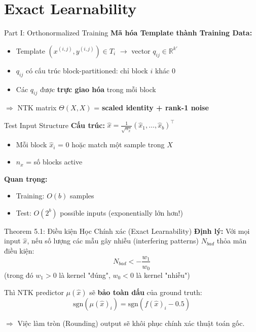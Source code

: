 \section{Exact Learnability}

\begin{frame}{Part I: Orthonormalized Training}
  \textbf{Mã hóa Template thành Training Data:}
  \begin{itemize}
    \item Template $(x^{(i,j)}, y^{(i,j)}) \in T_i$ $\to$ vector $q_{ij} \in \mathbb{R}^{k'}$
    \item $q_{ij}$ có cấu trúc block-partitioned: chỉ block $i$ khác 0
    \item Các $q_{ij}$ được \textbf{trực giao hóa} trong mỗi block
  \end{itemize}

  \vspace{0.3cm}
  $\Rightarrow$ NTK matrix $\Theta(X,X)$ = \textbf{scaled identity + rank-1 noise}
\end{frame}

\begin{frame}{Test Input Structure}
  \textbf{Cấu trúc:} $\hat{x} = \frac{1}{\sqrt{n_{\hat{x}}}} (\hat{x}_1, \ldots, \hat{x}_b)^\top$
  
  \begin{itemize}
    \item Mỗi block $\hat{x}_i$ = 0 hoặc match một sample trong $X$
    \item $n_{\hat{x}}$ = số blocks active
  \end{itemize}

  \vspace{0.3cm}
  \textbf{Quan trọng:}
  \begin{itemize}
    \item Training: $O(b)$ samples
    \item Test: $O(2^b)$ possible inputs (exponentially lớn hơn!)
  \end{itemize}
\end{frame}

\begin{frame}{Theorem 5.1: Điều kiện Học Chính xác (Exact Learnability)}
  \textbf{Định lý:}
  Với mọi input $\hat{x}$, nếu số lượng các mẫu gây nhiễu (interfering patterns) $N_{bad}$ thỏa mãn điều kiện:
  \[
    N_{bad} < -\frac{w_1}{w_0}
  \]
  (trong đó $w_1 > 0$ là kernel "đúng", $w_0 < 0$ là kernel "nhiễu")
  
  Thì NTK predictor $\mu(\hat{x})$ sẽ \textbf{bảo toàn dấu} của ground truth:
  \[
    \text{sgn}(\mu(\hat{x})_i) = \text{sgn}(f(\hat{x})_i - 0.5)
  \]
  
  $\Rightarrow$ Việc làm tròn (Rounding) output sẽ khôi phục chính xác thuật toán gốc.
\end{frame}

